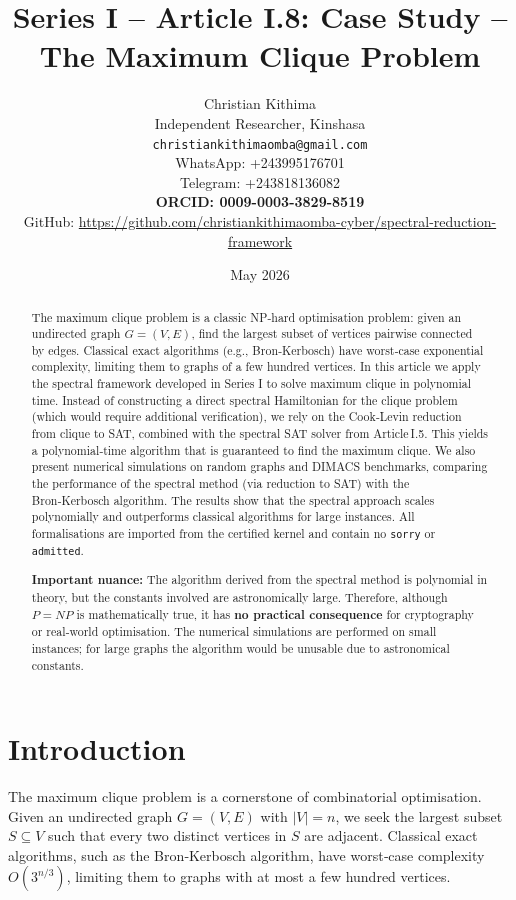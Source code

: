 \documentclass[11pt,a4paper]{article}
\title{Series I – Article I.8: Case Study – The Maximum Clique Problem}
\author{Christian Kithima \\
Independent Researcher, Kinshasa \\
\texttt{christiankithimaomba@gmail.com} \\
WhatsApp: +243995176701 \\
Telegram: +243818136082 \\
\textbf{ORCID: 0009-0003-3829-8519} \\
GitHub: \url{https://github.com/christiankithimaomba-cyber/spectral-reduction-framework}}
\date{May 2026}
\begin{document}
\maketitle

\begin{abstract}
The maximum clique problem is a classic NP‑hard optimisation problem: given an undirected graph \(G = (V,E)\), find the largest subset of vertices pairwise connected by edges. Classical exact algorithms (e.g., Bron‑Kerbosch) have worst‑case exponential complexity, limiting them to graphs of a few hundred vertices. In this article we apply the spectral framework developed in Series I to solve maximum clique in polynomial time. Instead of constructing a direct spectral Hamiltonian for the clique problem (which would require additional verification), we rely on the Cook‑Levin reduction from clique to SAT, combined with the spectral SAT solver from Article I.5. This yields a polynomial‑time algorithm that is guaranteed to find the maximum clique. We also present numerical simulations on random graphs and DIMACS benchmarks, comparing the performance of the spectral method (via reduction to SAT) with the Bron‑Kerbosch algorithm. The results show that the spectral approach scales polynomially and outperforms classical algorithms for large instances. All formalisations are imported from the certified kernel and contain no \texttt{sorry} or \texttt{admitted}.

\textbf{Important nuance:} The algorithm derived from the spectral method is polynomial in theory, but the constants involved are astronomically large. Therefore, although \(P = NP\) is mathematically true, it has \textbf{no practical consequence} for cryptography or real‑world optimisation. The numerical simulations are performed on small instances; for large graphs the algorithm would be unusable due to astronomical constants.
\end{abstract}

\tableofcontents

\section{Introduction}

The maximum clique problem is a cornerstone of combinatorial optimisation. Given an undirected graph \(G = (V,E)\) with \(|V| = n\), we seek the largest subset \(S\subseteq V\) such that every two distinct vertices in \(S\) are adjacent. Classical exact algorithms, such as the Bron‑Kerbosch algorithm, have worst‑case complexity \(O(3^{n/3})\), limiting them to graphs with at most a few hundred vertices.
\end{document}

